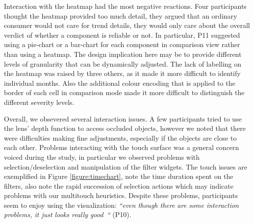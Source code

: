 Interaction with the heatmap had the most negative reactions. Four participants
thought the heatmap provided too much detail, they argued that an ordinary
consumer would not care for trend details, they would only care about the
overall verdict of whether a component is reliable or not. In particular, P11
suggested using a pie-chart or a bar-chart for each component in comparison view
rather than using a heatmap.  The design implication here may be to provide
different levels of granularity that can be dynamically adjusted. The lack of
labelling on the heatmap was raised by three others, as it made it more
difficult to identify individual months. Also the additional colour encoding
that is applied to the border of each cell in comparison mode made it more
difficult to distinguish the different severity levels. 

Overall, we obsevered several interaction issues. A few participants tried to
use the lens' depth function to access occluded objects, however we noted that
there were difficulties making fine adjustments, especially if the objects are
close to each other. Problems interacting with the touch surface was a general
concern voiced during the study, in particular we observed problems with
selection/deselection and manipulation of the filter widgets. The touch issues 
are exemplified in Figure \ref{figure:timechart}, note the time duration spent
on the filters, also note the rapid succession of selection actions which may
indicate problems with our multitouch heuristics. Despite these problems,
participants seem to enjoy using the visualization: \emph{``even though there
are some interaction problems, it just looks really good~``} (P10).


  
